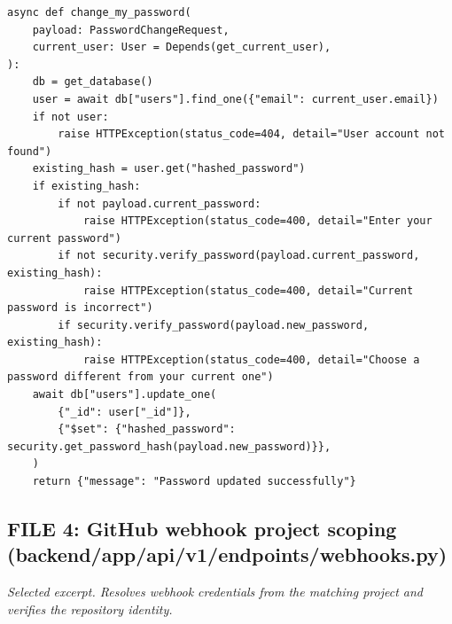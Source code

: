 \documentclass[11pt,a4paper]{article}
\begin{document}
{\begin{lstlisting}[style=python]
async def change_my_password(
    payload: PasswordChangeRequest,
    current_user: User = Depends(get_current_user),
):
    db = get_database()
    user = await db["users"].find_one({"email": current_user.email})
    if not user:
        raise HTTPException(status_code=404, detail="User account not found")
    existing_hash = user.get("hashed_password")
    if existing_hash:
        if not payload.current_password:
            raise HTTPException(status_code=400, detail="Enter your current password")
        if not security.verify_password(payload.current_password, existing_hash):
            raise HTTPException(status_code=400, detail="Current password is incorrect")
        if security.verify_password(payload.new_password, existing_hash):
            raise HTTPException(status_code=400, detail="Choose a password different from your current one")
    await db["users"].update_one(
        {"_id": user["_id"]},
        {"$set": {"hashed_password": security.get_password_hash(payload.new_password)}},
    )
    return {"message": "Password updated successfully"}
\end{lstlisting}

\subsection{FILE 4: GitHub webhook project scoping\\(backend/app/api/v1/endpoints/webhooks.py)}

\textit{Selected excerpt. Resolves webhook credentials from the matching project and verifies the repository identity.}

}
\end{document}
